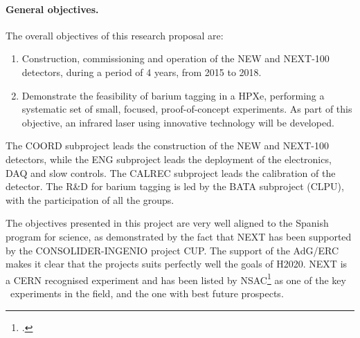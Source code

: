 \paragraph{General objectives.}
The overall objectives of this research proposal are:

\begin{enumerate}
\item Construction, commissioning and operation of the NEW and NEXT-100 detectors, during a period of 4 years, from 2015 to 2018.
\item Demonstrate the feasibility of barium tagging in a HPXe, performing a systematic set of small, focused, proof-of-concept experiments. As part of this objective, an infrared laser using innovative technology will be developed. 
\end{enumerate}
  
The COORD subproject leads the construction of the NEW and NEXT-100 detectors, while the ENG subproject leads the deployment of the electronics, DAQ and slow controls. The CALREC subproject leads the calibration of the detector. The R\&D for barium tagging is led by the BATA subproject (CLPU), with the participation of all the groups.   

The objectives presented in this project are very well aligned to the Spanish program for science, as demonstrated by the fact that NEXT has been supported by the CONSOLIDER-INGENIO project CUP. The support of the AdG/ERC makes it clear that the projects suits perfectly well the goals of H2020. NEXT is a CERN recognised experiment and has been listed by NSAC\footcite{NLDBD} as one of the key \bbonu\ experiments in the field, and the one with best future prospects.




